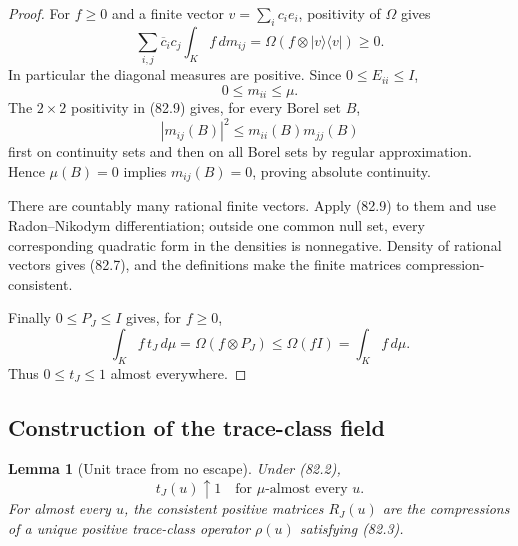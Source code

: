 \documentclass[11pt]{article}
\newtheorem{lemma}[theorem]{Lemma}
\theoremstyle{remark}
\begin{document}
\begin{proof}
For \(f\geq0\) and a finite vector
\(v=\sum_i c_ie_i\), positivity of \(\Omega\) gives
\begin{equation}
 \sum_{i,j}\overline c_i c_j
 \int_Kf\,dm_{ij}
 =
 \Omega(f\otimes|v\rangle\langle v|)\geq0.                  \tag{82.9}
\end{equation}
In particular the diagonal measures are positive.  Since
\(0\leq E_{ii}\leq I\),
\[
                         0\leq m_{ii}\leq\mu.                \tag{82.10}
\]
The \(2\times2\) positivity in (82.9) gives, for every Borel set
\(B\),
\[
 |m_{ij}(B)|^2\leq m_{ii}(B)m_{jj}(B)
\]
first on continuity sets and then on all Borel sets by regular
approximation.  Hence \(\mu(B)=0\) implies \(m_{ij}(B)=0\), proving
absolute continuity.

There are countably many rational finite vectors.  Apply (82.9) to
them and use Radon--Nikodym differentiation; outside one common null
set, every corresponding quadratic form in the densities is
nonnegative.  Density of rational vectors gives (82.7), and the
definitions make the finite matrices compression-consistent.

Finally \(0\leq P_J\leq I\) gives, for \(f\geq0\),
\[
 \int_K f\,t_J\,d\mu
 =\Omega(f\otimes P_J)
 \leq\Omega(fI)=\int_Kf\,d\mu.
\]
Thus \(0\leq t_J\leq1\) almost everywhere.
\end{proof}

\subsection{Construction of the trace-class field}

\begin{lemma}[Unit trace from no escape]
\label{lem:v12v82-unit-trace}
Under (82.2),
\begin{equation}
                              t_J(u)\uparrow1
                              \quad\text{for }\mu\text{-almost every }u.
                                                                    \tag{82.11}
\end{equation}
For almost every \(u\), the consistent positive matrices
\(R_J(u)\) are the compressions of a unique positive trace-class
operator \(\rho(u)\) satisfying (82.3).
\end{lemma}
\end{document}
